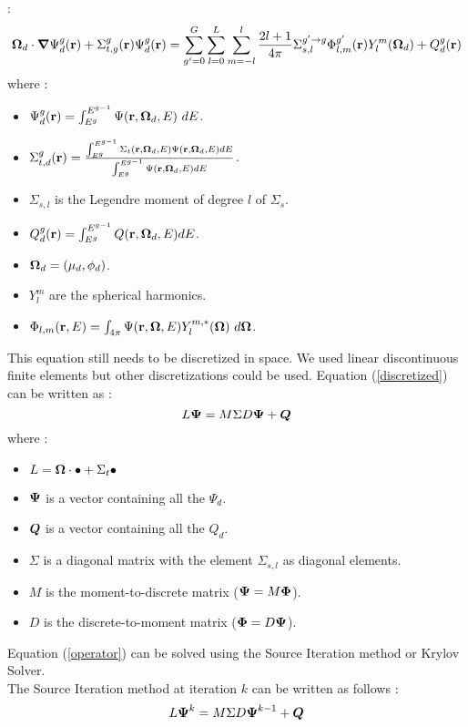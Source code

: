 \cite{reuss} :
\begin{equation}
\boldsymbol{\Omega}_d \cdot \boldsymbol{\nabla} \Psi_d^g(\mathbf{r}) + \Sigma_{t,g}^g(\mathbf{r}) \Psi_d^g(\mathbf{r}) = \sum_{g'=0}^G
\sum_{l=0}^L\sum_{m=-l}^l \frac{2l+1}{4\pi}\Sigma_{s,l}^{g'\rightarrow
g}\Phi_{l,m}^{g'}(\mathbf{r})Y_l^m(\boldsymbol{\Omega}_d) + Q_d^g(\mathbf{r})
\label{discretized}
\end{equation}
where :
\begin{itemize}
\item $\Psi_d^g(\br)=\int_{E^{g}}^{E^{g-1}}\Psi(\br,\bo_d,E)\ dE$.
\item $\Sigma_{t,d}^g(\mathbf{r}) = \frac{\int_{E^{g}}^{E^{g-1}}\Sigma_t(\mathbf{r},\boldsymbol{\Omega}_d,E)
\Psi(\mathbf{r},\boldsymbol{\Omega}_d,E) dE}{\int_{E^g}^{E^{g-1}}\Psi(\mathbf{r},\boldsymbol{\Omega}_d,E) dE}$.
\item $\Sigma_{s,l}$ is the Legendre moment of degree $l$ of $\Sigma_s$.
\item $Q_d^g(\mathbf{r}) = \int_{E^g}^{E^{g-1}}Q(\mathbf{r},\boldsymbol{\Omega}_d,E) dE$.
\item $\boldsymbol{\Omega}_d = (\mu_d,\phi_d)$.
\item $Y_l^m$ are the spherical harmonics.
\item $\Phi_{l,m}(\mathbf{r},E)= \int_{4\pi}\Psi(\mathbf{r},\boldsymbol{\Omega},E)Y_l^{m,*}(\boldsymbol{\Omega})\ d\boldsymbol{\Omega}$.
\end{itemize}
This equation still needs to be discretized in space. We used linear
discontinuous finite elements but other discretizations could be used. Equation
(\ref{discretized}) can be written as :
\begin{equation}
L \boldsymbol{\Psi} = M\Sigma D \boldsymbol{\Psi} + \boldsymbol{Q}
\label{operator}
\end{equation}
where :
\begin{itemize}
\item $L = \boldsymbol{\Omega}\cdot \bullet + \Sigma_t \bullet$
\item $\boldsymbol{\Psi}$ is a vector containing all the $\Psi_d$.
\item $\boldsymbol{Q}$ is a vector containing all the $Q_d$.
\item $\Sigma$ is a diagonal matrix with the element $\Sigma_{s,l}$ as
diagonal elements.
\item $M$ is the moment-to-discrete matrix ($\boldsymbol{\Psi}=M\boldsymbol{\Phi}$).
\item $D$ is the discrete-to-moment matrix ($\boldsymbol{\Phi}=D\boldsymbol{\Psi}$).
\end{itemize}
Equation (\ref{operator}) can be solved using the Source Iteration method or
Krylov Solver.\\
The Source Iteration method at iteration $k$ can be written as follows :
\begin{equation}
L\boldsymbol{\Psi}^k = M\Sigma D \boldsymbol{\Psi}^{k-1} + \boldsymbol{Q}
\end{equation}
